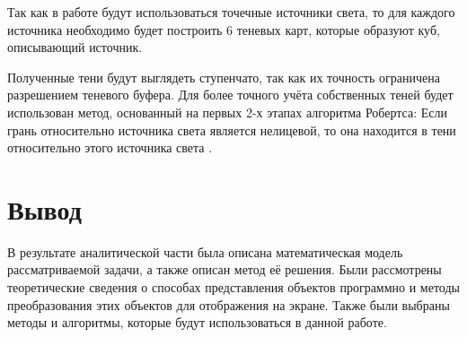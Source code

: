 Так как в работе будут использоваться точечные источники света, то для каждого источника необходимо будет построить 6 теневых карт, которые образуют куб, описывающий источник.

Полученные тени будут выглядеть ступенчато, так как их точность ограничена разрешением теневого буфера. Для более точного учёта собственных теней будет использован метод, основанный на первых 2-х этапах алгоритма Робертса: Если грань относительно источника света является нелицевой, то она находится в тени относительно этого источника света \cite{rodgers}.

\section*{Вывод}

В результате аналитической части была описана математическая модель рассматриваемой задачи, а также описан метод её решения. Были рассмотрены теоретические сведения о способах представления объектов программно и методы преобразования этих объектов для отображения на экране. Также были выбраны методы и алгоритмы, которые будут использоваться в данной работе.

\clearpage

